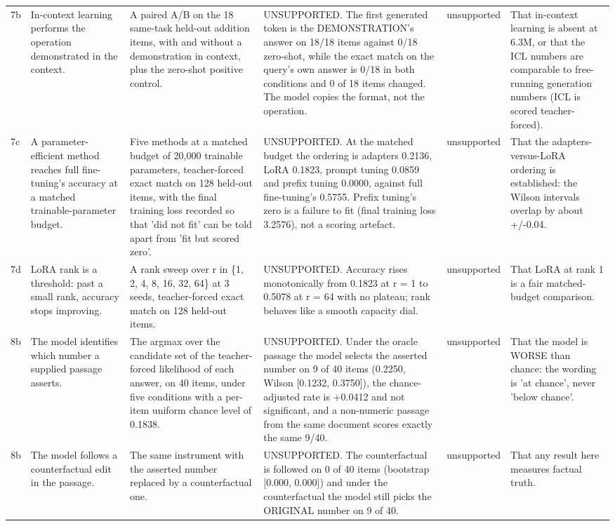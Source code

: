 {\begin{longtable}{L{0.9cm}L{2.8cm}L{2.7cm}L{3.0cm}L{1.9cm}L{2.1cm}}
7b & In-context learning performs the operation demonstrated in the context. & A paired A/B on the 18 same-task held-out addition items, with and without a demonstration in context, plus the zero-shot positive control. & UNSUPPORTED. The first generated token is the DEMONSTRATION's answer on 18/18 items against 0/18 zero-shot, while the exact match on the query's own answer is 0/18 in both conditions and 0 of 18 items changed. The model copies the format, not the operation. & unsupported & That in-context learning is absent at 6.3M, or that the ICL numbers are comparable to free-running generation numbers (ICL is scored teacher-forced). \\
7c & A parameter-efficient method reaches full fine-tuning's accuracy at a matched trainable-parameter budget. & Five methods at a matched budget of 20,000 trainable parameters, teacher-forced exact match on 128 held-out items, with the final training loss recorded so that 'did not fit' can be told apart from 'fit but scored zero'. & UNSUPPORTED. At the matched budget the ordering is adapters 0.2136, LoRA 0.1823, prompt tuning 0.0859 and prefix tuning 0.0000, against full fine-tuning's 0.5755. Prefix tuning's zero is a failure to fit (final training loss 3.2576), not a scoring artefact. & unsupported & That the adapters-versus-LoRA ordering is established: the Wilson intervals overlap by about +/-0.04. \\
7d & LoRA rank is a threshold: past a small rank, accuracy stops improving. & A rank sweep over r in \{1, 2, 4, 8, 16, 32, 64\} at 3 seeds, teacher-forced exact match on 128 held-out items. & UNSUPPORTED. Accuracy rises monotonically from 0.1823 at r = 1 to 0.5078 at r = 64 with no plateau; rank behaves like a smooth capacity dial. & unsupported & That LoRA at rank 1 is a fair matched-budget comparison. \\
8b & The model identifies which number a supplied passage asserts. & The argmax over the candidate set of the teacher-forced likelihood of each answer, on 40 items, under five conditions with a per-item uniform chance level of 0.1838. & UNSUPPORTED. Under the oracle passage the model selects the asserted number on 9 of 40 items (0.2250, Wilson [0.1232, 0.3750]), the chance-adjusted rate is +0.0412 and not significant, and a non-numeric passage from the same document scores exactly the same 9/40. & unsupported & That the model is WORSE than chance: the wording is 'at chance', never 'below chance'. \\
8b & The model follows a counterfactual edit in the passage. & The same instrument with the asserted number replaced by a counterfactual one. & UNSUPPORTED. The counterfactual is followed on 0 of 40 items (bootstrap [0.000, 0.000]) and under the counterfactual the model still picks the ORIGINAL number on 9 of 40. & unsupported & That any result here measures factual truth. \\

\end{longtable}}
